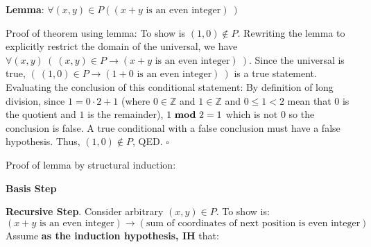 \documentclass[12pt, oneside]{article}
\begin{document}
{\bf Lemma}: $\forall (x,y) \in P( (x+y \textrm{ is an even integer})~)$


Proof of theorem using lemma: To show is $(1,0) \notin P$. Rewriting the lemma to explicitly 
restrict the domain of the universal, 
we have $\forall (x,y) ~(~ (x,y) \in P  \to (x+y \textrm{ is an even integer})~)$.  Since
the universal is true, 
$ (~ (1,0) \in P \to (1+0 \textrm{ is an even integer})~)$ is a true statement.
Evaluating the conclusion of this conditional statement: 
By definition of long division, since $1 = 0 \cdot 2 + 1$ (where $0 \in \mathbb{Z}$ and 
$1 \in \mathbb{Z}$ and $0 \leq 1 < 2$ mean that $0$ is the quotient and $1$ is the remainder), $1 ~\textrm{\bf mod}~ 2 = 1$ which is not $0$ 
so the conclusion is false.  A true conditional with a false conclusion must have a false hypothesis.
Thus, $(1,0) \notin P$, QED. $\square$



Proof of lemma by structural induction:

{\bf Basis Step}


{\bf Recursive Step}.  Consider arbitrary $(x,y) \in P$.  To show is:
\[
(x+y \text{ is an even integer}) \to (\text{sum of coordinates of next position is even integer})
\]
Assume {\bf as the induction hypothesis, IH} that: 
\vfill


\newpage



\vspace{-20pt}
\end{document}
